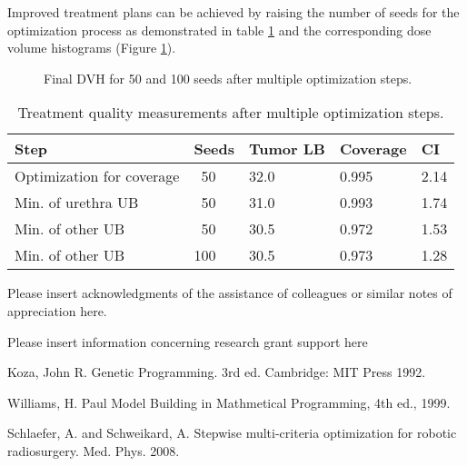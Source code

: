 \documentclass[USenglish,twocolumn]{article}
\begin{document}
		Improved treatment plans can be achieved by raising the number of seeds for the optimization process as demonstrated in table \ref{table:LPSW_results} and the corresponding dose volume histograms (Figure \ref{fig:LPSW_compare}).

		\begin{figure}[ht]
			\centering
			 
			\caption{Final DVH for 50 and 100 seeds after multiple optimization steps.}
			\label{fig:LPSW_compare}
		\end{figure}

		\begin{table}[ht]
			\centering		
		 	\caption{Treatment quality measurements after multiple optimization steps.}
		 	\label{table:LPSW_results}
			\begin{tabular}{p{}|p{}|p{}|p{}|p{}}
					Step 					  	& Seeds  & Tumor LB 	& Coverage 	& CI\\	\hline
					Optimization for coverage 	& ~50 	 & 32.0 		& 0.995		& 2.14\\ \hline
					Min. of urethra UB 		  	& ~50	 & 31.0 		& 0.993		& 1.74\\ \hline
					Min. of other UB 			& ~50	 & 30.5			& 0.972		& 1.53\\ \hline \hline
					Min. of other UB 			& 100	 & 30.5			& 0.973		& 1.28\\
			\end{tabular}
		\end{table}	



\begin{acknowledgement}
Please insert acknowledgments of the assistance of colleagues or similar notes of appreciation here.
\end{acknowledgement}

\def\acknowledgementname{Funding}
\begin{acknowledgement}
Please insert information concerning research grant support here
\end{acknowledgement}

%
%

\begin{thebibliography}{9}



Koza, John R. Genetic Programming. 3rd ed. Cambridge: MIT Press 1992.

Williams, H. Paul Model Building in Mathmetical Programming, 4th ed., 1999.

Schlaefer, A. and Schweikard, A. Stepwise multi-criteria optimization for robotic radiosurgery. Med. Phys. 2008.



\end{thebibliography}
\end{document}
